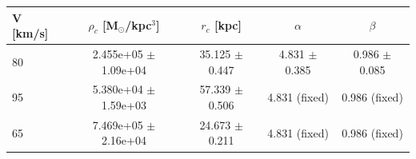 \begin{tabular}{lcccc}
\toprule
V [km/s] & $\rho_c$ [M$_\odot$/kpc$^3$] & $r_c$ [kpc] & $\alpha$ & $\beta$ \\
\midrule
80 & 2.455e+05 $\pm$ 1.09e+04 & 35.125 $\pm$ 0.447 & 4.831 $\pm$ 0.385 & 0.986 $\pm$ 0.085 \\
95 & 5.380e+04 $\pm$ 1.59e+03 & 57.339 $\pm$ 0.506 & 4.831 (fixed) & 0.986 (fixed) \\
65 & 7.469e+05 $\pm$ 2.16e+04 & 24.673 $\pm$ 0.211 & 4.831 (fixed) & 0.986 (fixed) \\
\bottomrule
\end{tabular}
